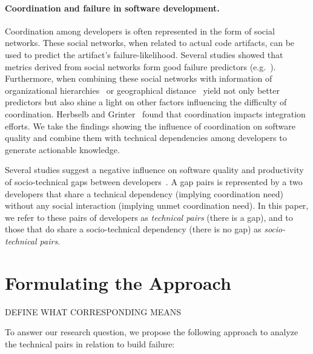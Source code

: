 \documentclass[conference]{IEEEtran}
\begin{document}
\paragraph{Coordination and failure in software development.}
Coordination among developers is often represented in the form of social networks.
These social networks, when related to actual code artifacts, can be used to predict the artifact's failure-likelihood.
Several studies showed that metrics derived from social networks form good failure predictors (e.g.~\cite{meneely:fse:2008}).
Furthermore, when combining these social networks with information of organizational hierarchies~\cite{nagappan:icse:2008} or geographical distance~\cite{bird:acm:2009} yield not only better predictors but also shine a light on other factors influencing the difficulty of coordination.
Herbselb and Grinter~\cite{herbsleb:icse:1999} found that coordination impacts integration efforts.
We take the findings showing the influence of coordination on software quality and combine them with technical dependencies among developers to generate actionable knowledge.

Several studies suggest a negative influence on software quality and productivity of socio-technical gaps between developers~\cite{valetto:msr:2007,kwan:tse:2011}.
A gap pairs is represented by a two developers that share a technical dependency (implying coordination need) without any social interaction (implying
unmet coordination need).
In this paper, we refer to these pairs of developers as \emph{technical pairs} (there is a gap), and to those that do
share a socio-technical dependency (there is no gap) as \emph{socio-technical pairs}.

\section{Formulating the Approach}
DEFINE WHAT CORRESPONDING MEANS

To answer our research question, we propose the following approach to analyze the technical pairs in relation to build failure:
\end{document}

